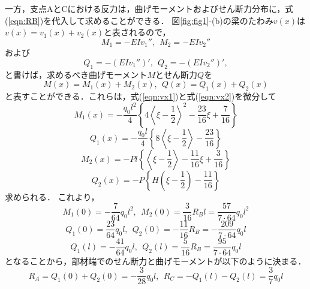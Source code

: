 \documentclass[10pt,a4j]{jarticle}
\begin{document}
\begin{enumerate}
一方，支点AとCにおける反力は，曲げモーメントおよびせん断力分布に，式(\ref{eqn:RB})を代入して求めることができる．
図\ref{fig:fig1}-(b)の梁のたわみ$v(x)$は$v(x)=v_1(x)+v_2(x)$と表されるので，
\begin{equation}
	M_1=-EIv_1'', \ \ M_2=-EIv_2''
\end{equation}
および
\begin{equation}
	Q_1=-(EIv_1'')', \ \ Q_2=-(EIv_2'')',
\end{equation}
と書けば，求めるべき曲げモーメント$M$とせん断力$Q$を
\begin{equation}
	M(x)=M_1(x)+M_2(x),  \  \
	Q(x)=Q_1(x)+Q_2(x)
\end{equation}
と表すことができる．これらは，式(\ref{eqn:vx1})と式(\ref{eqn:vx2})を微分して
	\begin{equation}
	M_1(x)=-\frac{q_0l^2}{4}\left\{
		4\left< \xi -\frac{1}{2}\right> ^2
		-
		\frac{23}{16}
		\xi
		+
		\frac{7}{16}
	\right\}
		\label{eqn:Mx1}
		\end{equation}
	\begin{equation}
	Q_1(x)=-\frac{q_0l}{4}\left\{
		8\left< \xi -\frac{1}{2}\right> 
		-
		\frac{23}{16}
	\right\}
	\label{eqn:Qx1}
	\end{equation}
	\begin{equation}
	M_2(x)=-Pl\left\{
		\left< \xi -\frac{1}{2}\right> 
			-
			\frac{11}{16} \xi
			+
			\frac{3}{16}
		\right\}
		\label{eqn:Mx2}
		\end{equation}
	\begin{equation}
	Q_2(x)=-P\left\{
		H\left( \xi -\frac{1}{2}\right) 
		-
		\frac{11}{16}
	\right\}
	\label{eqn:Qx2}
	\end{equation}
求められる．
これより，
\begin{equation}
	M_1(0)=-\frac{7}{64}q_0l^2, \ \ M_2(0)=\frac{3}{16}R_Bl=\frac{57}{7\cdot 64}q_0l^2
\end{equation}
\begin{equation}
	Q_1(0)=\frac{23}{64}q_0l, \ \ Q_2(0)=-\frac{11}{16}R_B=-\frac{209}{7\cdot 64}q_0l
\end{equation}
\begin{equation}
	Q_1(l)=-\frac{41}{64}q_0l, \ \ Q_2(l)=\frac{5}{16}R_B=\frac{95}{7\cdot 64 }q_0l
\end{equation}
となることから，部材端でのせん断力と曲げモーメントが以下のように決まる．
\begin{equation}
	R_A=Q_1(0)+Q_2(0)= -\frac{3}{28}q_0l, \ \ R_C=-Q_1(l)-Q_2(l)=\frac{3}{7}q_0l
\end{equation}
\begin{equation}

\end{equation}
\end{enumerate}
\end{document}
